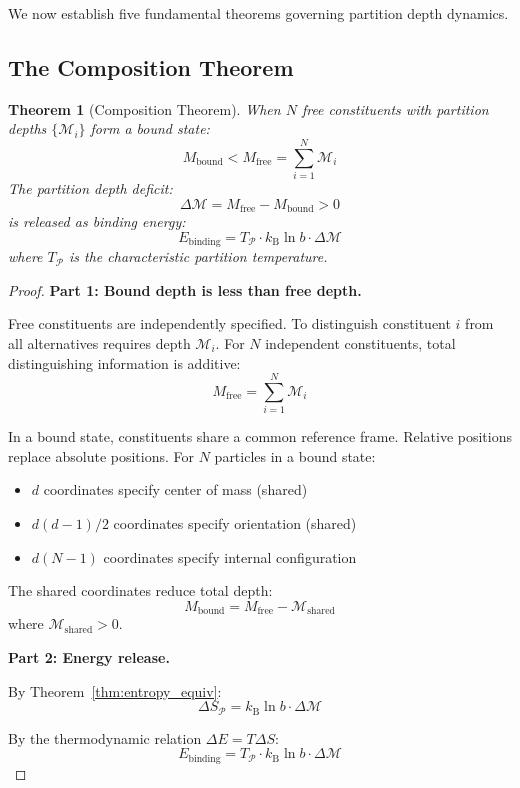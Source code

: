 \documentclass[twocolumn,10pt,a4paper]{article}
\newtheorem{theorem}{Theorem}[section]
\theoremstyle{definition}
\theoremstyle{remark}
\newcommand{\kB}{k_{\mathrm{B}}}
\newcommand{\Partition}{\mathcal{P}}
\newcommand{\Depth}{\mathcal{M}}
\newcommand{\Mfree}{M_{\mathrm{free}}}
\newcommand{\Mbound}{M_{\mathrm{bound}}}
\begin{document}
We now establish five fundamental theorems governing partition depth dynamics.

\subsection{The Composition Theorem}

\begin{theorem}[Composition Theorem]
\label{thm:composition}
When $N$ free constituents with partition depths $\{\Depth_i\}$ form a bound state:
\begin{equation}
    \Mbound < \Mfree = \sum_{i=1}^{N} \Depth_i
\end{equation}
The partition depth deficit:
\begin{equation}
    \Delta\Depth = \Mfree - \Mbound > 0
\end{equation}
is released as binding energy:
\begin{equation}
    E_{\text{binding}} = T_{\Partition} \cdot \kB \ln b \cdot \Delta\Depth
\end{equation}
where $T_{\Partition}$ is the characteristic partition temperature.
\end{theorem}

\begin{proof}
\textbf{Part 1: Bound depth is less than free depth.}

Free constituents are independently specified. To distinguish constituent $i$ from all alternatives requires depth $\Depth_i$. For $N$ independent constituents, total distinguishing information is additive:
\begin{equation}
    \Mfree = \sum_{i=1}^{N} \Depth_i
\end{equation}

In a bound state, constituents share a common reference frame. Relative positions replace absolute positions. For $N$ particles in a bound state:
\begin{itemize}
    \item $d$ coordinates specify center of mass (shared)
    \item $d(d-1)/2$ coordinates specify orientation (shared)
    \item $d(N-1)$ coordinates specify internal configuration
\end{itemize}

The shared coordinates reduce total depth:
\begin{equation}
    \Mbound = \Mfree - \Depth_{\text{shared}}
\end{equation}
where $\Depth_{\text{shared}} > 0$.

\textbf{Part 2: Energy release.}

By Theorem~\ref{thm:entropy_equiv}:
\begin{equation}
    \Delta S_{\Partition} = \kB \ln b \cdot \Delta\Depth
\end{equation}

By the thermodynamic relation $\Delta E = T \Delta S$:
\begin{equation}
    E_{\text{binding}} = T_{\Partition} \cdot \kB \ln b \cdot \Delta\Depth
\end{equation}
\end{proof}
\end{document}
